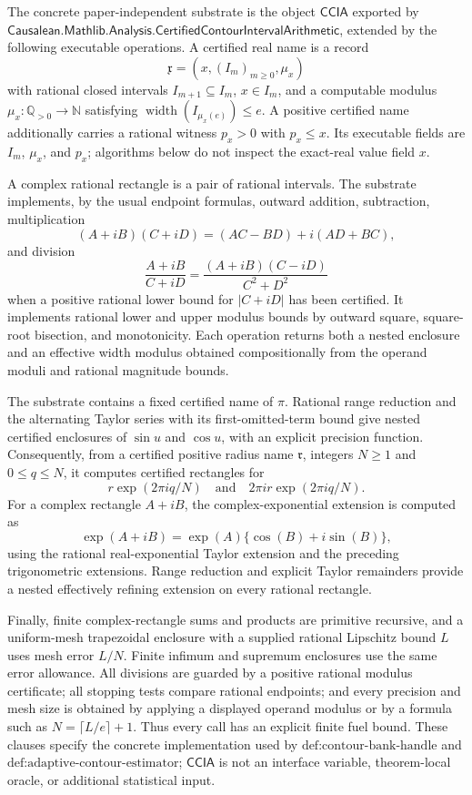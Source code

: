 The concrete paper-independent substrate is the object \(\mathsf{CCIA}\) exported by \(\mathsf{Causalean.Mathlib.Analysis.CertifiedContourIntervalArithmetic}\), extended by the following executable operations.  A certified real name is a record
\[
 \mathfrak x=(x,(I_m)_{m\ge0},\mu_x)
\]
with rational closed intervals \(I_{m+1}\subseteq I_m\), \(x\in I_m\), and a computable modulus \(\mu_x:\mathbb Q_{>0}\to\mathbb N\) satisfying \(\operatorname{width}(I_{\mu_x(e)})\le e\).  A positive certified name additionally carries a rational witness \(p_x>0\) with \(p_x\le x\).  Its executable fields are \(I_m\), \(\mu_x\), and \(p_x\); algorithms below do not inspect the exact-real value field \(x\).

A complex rational rectangle is a pair of rational intervals.  The substrate implements, by the usual endpoint formulas, outward addition, subtraction, multiplication
\[
 (A+iB)(C+iD)=(AC-BD)+i(AD+BC),
\]
and division
\[
 \frac{A+iB}{C+iD}
 =\frac{(A+iB)(C-iD)}{C^2+D^2}
\]
when a positive rational lower bound for \(|C+iD|\) has been certified.  It implements rational lower and upper modulus bounds by outward square, square-root bisection, and monotonicity.  Each operation returns both a nested enclosure and an effective width modulus obtained compositionally from the operand moduli and rational magnitude bounds.

The substrate contains a fixed certified name of \(\pi\).  Rational range reduction and the alternating Taylor series with its first-omitted-term bound give nested certified enclosures of \(\sin u\) and \(\cos u\), with an explicit precision function.  Consequently, from a certified positive radius name \(\mathfrak r\), integers \(N\ge1\) and \(0\le q\le N\), it computes certified rectangles for
\[
 r\exp(2\pi iq/N)
 \quad\text{and}\quad
 2\pi i r\exp(2\pi iq/N).
\]
For a complex rectangle \(A+iB\), the complex-exponential extension is computed as
\[
 \exp(A+iB)=\exp(A)\{\cos(B)+i\sin(B)\},
\]
using the rational real-exponential Taylor extension and the preceding trigonometric extensions.  Range reduction and explicit Taylor remainders provide a nested effectively refining extension on every rational rectangle.

Finally, finite complex-rectangle sums and products are primitive recursive, and a uniform-mesh trapezoidal enclosure with a supplied rational Lipschitz bound \(L\) uses mesh error \(L/N\).  Finite infimum and supremum enclosures use the same error allowance.  All divisions are guarded by a positive rational modulus certificate; all stopping tests compare rational endpoints; and every precision and mesh size is obtained by applying a displayed operand modulus or by a formula such as \(N=\lceil L/e\rceil+1\).  Thus every call has an explicit finite fuel bound.  These clauses specify the concrete implementation used by \(\text{def:contour-bank-handle}\) and \(\text{def:adaptive-contour-estimator}\); \(\mathsf{CCIA}\) is not an interface variable, theorem-local oracle, or additional statistical input.